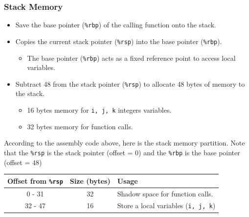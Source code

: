 \documentclass[12pt, a4paper]{article}
\begin{document}
            \subsubsection{Stack Memory}
                \begin{itemize}
                    \item Save the base pointer (\texttt{\%rbp}) of the calling function onto the stack.
                    \item Copies the current stack pointer (\texttt{\%rsp}) into the base pointer (\texttt{\%rbp}).
                    \begin{itemize}
                        \item The base pointer (\texttt{\%rbp}) acts as a fixed reference point to access local variables.
                    \end{itemize}
                    \item Subtract 48 from the stack pointer (\texttt{\%rsp}) to allocate 48 bytes of memory to the stack.
                    \begin{itemize}
                        \item 16 bytes memory for \texttt{i, j, k} integers variables.
                        \item 32 bytes memory for function calls.
                    \end{itemize}
                \end{itemize}

                \noindent According to the assembly code above, here is the stack memory partition.
                Note that the \texttt{\%rsp} is the stack pointer (offset = 0)
                and the \texttt{\%rbp} is the base pointer (offset = 48)
                \begin{table}[h]
                    \centering
                    \begin{tabular}{|c|c|l|}
                        \hline
                        Offset from \texttt{\%rsp} & Size (bytes) & Usage \\
                        \hline \hline
                        0 - 31 & 32 & Shadow space for function calls. \\
                        32 - 47 & 16 & Store a local variables (\texttt{i, j, k}) \\
                        \hline
                    \end{tabular}
                \end{table}
\end{document}
